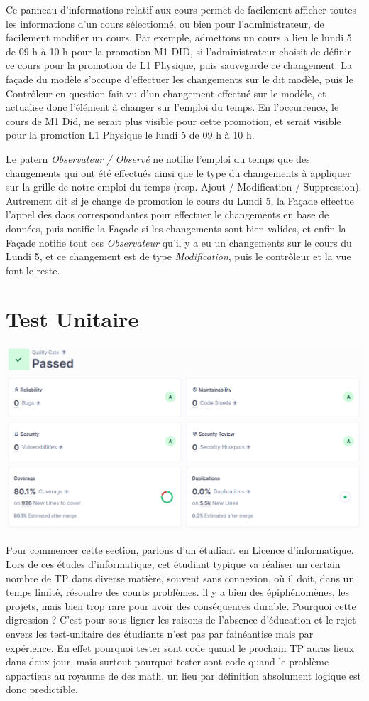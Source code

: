 \documentclass[a4paper,french,final]{memoir}
\begin{document}
Ce panneau d'informations relatif aux cours permet de facilement afficher toutes les informations d'un cours sélectionné, ou bien pour l'administrateur, de facilement modifier un cours.
Par exemple, admettons un cours a lieu le lundi 5 de 09 h à 10 h pour la promotion M1 DID, si l'administrateur choisit de définir ce cours pour la promotion de L1 Physique, puis sauvegarde ce changement.
La façade du modèle s'occupe d'effectuer les changements sur le dit modèle, puis le Contrôleur en question fait vu d'un changement effectué sur le modèle, et actualise donc l'élément à changer sur l'emploi du temps.
En l'occurrence, le cours de M1 Did, ne serait plus visible pour cette promotion, et serait visible pour la promotion L1 Physique le lundi 5 de 09 h à 10 h.

Le patern \emph{Observateur / Observé} ne notifie l'emploi du temps que des changements qui ont été effectués ainsi que le type du changements à appliquer sur la grille de notre emploi du temps (resp. Ajout / Modification / Suppression).
Autrement dit si je change de promotion le cours du Lundi 5, la Façade effectue l'appel des daos correspondantes pour effectuer le changements en base de données, puis notifie la Façade si les changements sont bien valides, et enfin la Façade notifie tout ces \emph{Observateur} qu'il y a eu un changements sur le cours du Lundi 5, et ce changement est de type \emph{Modification}, puis le contrôleur et la vue font le reste.

\section{Test Unitaire}
\includegraphics[width=\textwidth]{figures/coverage.png}

Pour commencer cette section, parlons d'un étudiant en Licence d'informatique.
Lors de ces études d'informatique, cet étudiant typique va réaliser un certain nombre de TP dans diverse matière, souvent
sans connexion, où il doit, dans un temps limité, résoudre des courts problèmes. il y a bien des épiphénomènes, les projets,
mais bien trop rare pour avoir des conséquences durable.
Pourquoi cette digression ? C'est pour sous-ligner les raisons de l'absence d'éducation et le rejet envers les test-unitaire des étudiants
n'est pas par fainéantise mais par expérience. En effet pourquoi tester sont code quand le prochain TP auras lieux dans deux jour,
mais surtout pourquoi tester sont code quand le problème appartiens au royaume de des math, un lieu par définition absolument logique est donc predictible.
\end{document}
